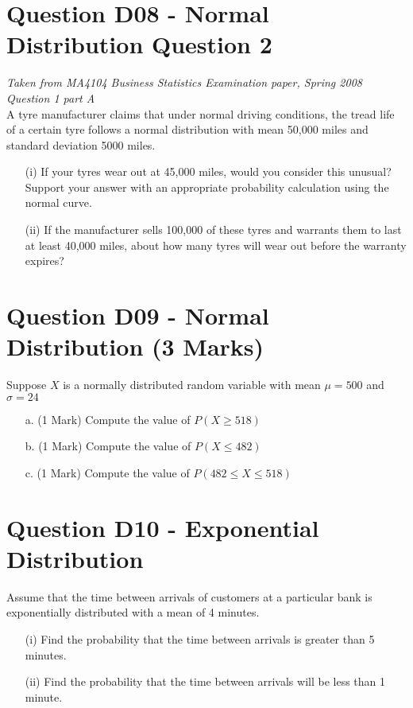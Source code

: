 \documentclass[]{report}
\begin{document}
\section{Question D08 - Normal Distribution Question 2}
\emph{Taken from MA4104 Business Statistics Examination paper, Spring 2008 Question 1 part A}\\


A tyre manufacturer claims that under normal driving conditions, the tread life of a certain tyre follows a normal distribution with mean 50,000 miles and standard deviation 5000 miles.

\begin{itemize}
	\item [(i)] If your tyres wear out at 45,000 miles, would you consider this unusual? Support your answer with an appropriate probability calculation using the normal curve. %
	
	\item [(ii)] If the manufacturer sells 100,000 of these tyres and warrants them to last at least 40,000 miles, about how many tyres will wear out before the warranty expires?%
\end{itemize}

\section{Question D09 - Normal Distribution (3 Marks)} %
Suppose $X$ is a normally distributed random variable with mean $\mu =500$ and $\sigma = 24$

\begin{itemize}
	\item[a.] (1 Mark) Compute the value of $P(X \geq 518)$
	\item[b.] (1 Mark) Compute the value of $P(X \leq 482)$
	\item[c.] (1 Mark) Compute the value of $P(482 \leq X \leq 518)$
\end{itemize}


\section{Question D10 -  Exponential Distribution}

Assume that the time between arrivals of customers at a particular bank is exponentially distributed with a mean of 4 minutes. 

\begin{itemize}
	\item[(i)]
	Find the probability that the time between arrivals is greater than 5 minutes.
	\item[(ii)]
	Find the probability that the time between arrivals will be less than 1 minute.
\end{itemize}
\end{document}
